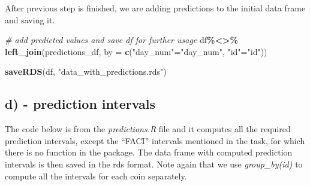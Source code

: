 \documentclass[
]{article}
\newenvironment{Shaded}{\begin{snugshade}}{\end{snugshade}}
\newcommand{\AttributeTok}[1]{\textcolor[rgb]{0.13,0.29,0.53}{#1}}
\newcommand{\CommentTok}[1]{\textcolor[rgb]{0.56,0.35,0.01}{\textit{#1}}}
\newcommand{\DecValTok}[1]{\textcolor[rgb]{0.00,0.00,0.81}{#1}}
\newcommand{\FunctionTok}[1]{\textcolor[rgb]{0.13,0.29,0.53}{\textbf{#1}}}
\newcommand{\NormalTok}[1]{#1}
\newcommand{\OtherTok}[1]{\textcolor[rgb]{0.56,0.35,0.01}{#1}}
\newcommand{\SpecialCharTok}[1]{\textcolor[rgb]{0.81,0.36,0.00}{\textbf{#1}}}
\newcommand{\StringTok}[1]{\textcolor[rgb]{0.31,0.60,0.02}{#1}}
\begin{document}
\begin{Shaded}
\end{Shaded}

After previous step is finished, we are adding predictions to the
initial data frame and saving it.

\begin{Shaded}
\begin{Highlighting}[]
\CommentTok{\# add predicted values and save df for further usage}
\NormalTok{df}\SpecialCharTok{\%\textless{}\textgreater{}\%}
  \FunctionTok{left\_join}\NormalTok{(predictions\_df, }\AttributeTok{by =} \FunctionTok{c}\NormalTok{(}\StringTok{"day\_num"}\OtherTok{=}\StringTok{"day\_num"}\NormalTok{, }\StringTok{"id"}\OtherTok{=}\StringTok{"id"}\NormalTok{))}

\FunctionTok{saveRDS}\NormalTok{(df, }\StringTok{"data\_with\_predictions.rds"}\NormalTok{)}
\end{Highlighting}
\end{Shaded}

\newpage

\subsection{d) - prediction intervals}\label{d---prediction-intervals}

The code below is from the \emph{predictions.R} file and it computes all
the required prediction intervals, except the ``FACI'' intervals
mentioned in the task, for which there is no function in the package.
The data frame with computed prediction intervals is then saved in the
rds format. Note again that we use \emph{group\_by(id)} to compute all
the intervals for each coin separately.
\end{document}
